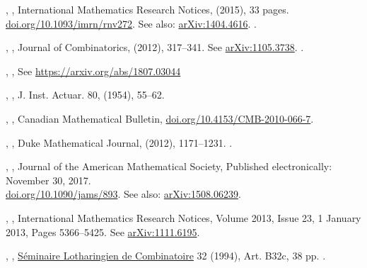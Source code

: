 \documentclass[12pt]{amsart}
\theoremstyle{plain}
\theoremstyle{definition}
\theoremstyle{remark}
\begin{document}
\begin{thebibliography}{10}
,
,
International Mathematics Research Notices, (2015), 33 pages.
\href{https://doi.org/10.1093/imrn/rnv272}{doi.org/10.1093/imrn/rnv272}. See also:
\href{http://arxiv.org/abs/1404.4616}{arXiv:1404.4616}.  .


,
, 
Journal of Combinatorics,  (2012), 317--341. 
See \href{http://arxiv.org/abs/arXiv:1105.3738}{arXiv:1105.3738}. .

,
, 
See \href{https://arxiv.org/abs/1807.03044}{https://arxiv.org/abs/1807.03044}

,
, J. Inst. Actuar. 80, (1954), 55--62.


 ,
,
Canadian Mathematical Bulletin,
\href{https://doi.org/10.4153/CMB-2010-066-7}{doi.org/10.4153/CMB-2010-066-7}. 

,
,
Duke Mathematical Journal,   (2012), 1171--1231. .

,
,
Journal of the American Mathematical Society, Published electronically: November 30, 2017.\\
\href{https://doi.org/10.1090/jams/893}{doi.org/10.1090/jams/893}.
See also: \href{http://arxiv.org/abs/arXiv:1508.06239}{arXiv:1508.06239}.

,
,
International Mathematics Research Notices, Volume 2013, Issue 23, 1 January 2013, Pages 5366--5425.
See \href{https://arxiv.org/abs/1111.6195}{arXiv:1111.6195}.

,
,
\href{http://www.mat.univie.ac.at/~slc/}{S\'eminaire Lotharingien de Combinatoire} 32 (1994), 
Art. B32c, 38 pp. .


\end{thebibliography}
\end{document}
